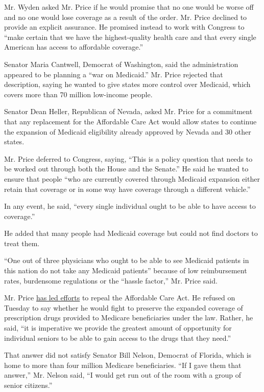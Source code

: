 Mr. Wyden asked Mr. Price if he would promise that no one would be worse
off and no one would lose coverage as a result of the order. Mr. Price
declined to provide an explicit assurance. He promised instead to work
with Congress to ``make certain that we have the highest-quality health
care and that every single American has access to affordable coverage.''

Senator Maria Cantwell, Democrat of Washington, said the administration
appeared to be planning a ``war on Medicaid.'' Mr. Price rejected that
description, saying he wanted to give states more control over Medicaid,
which covers more than 70 million low-income people.

Senator Dean Heller, Republican of Nevada, asked Mr. Price for a
commitment that any replacement for the Affordable Care Act would allow
states to continue the expansion of Medicaid eligibility already
approved by Nevada and 30 other states.

Mr. Price deferred to Congress, saying, ``This is a policy question that
needs to be worked out through both the House and the Senate.'' He said
he wanted to ensure that people ``who are currently covered through
Medicaid expansion either retain that coverage or in some way have
coverage through a different vehicle.''

In any event, he said, ``every single individual ought to be able to
have access to coverage.''

He added that many people had Medicaid coverage but could not find
doctors to treat them.

``One out of three physicians who ought to be able to see Medicaid
patients in this nation do not take any Medicaid patients'' because of
low reimbursement rates, burdensome regulations or the ``hassle
factor,'' Mr. Price said.

Mr. Price
\href{https://www.nytimes.com/2016/11/28/us/politics/tom-price-secretary-health-and-human-services.html}{has
led efforts} to repeal the Affordable Care Act. He refused on Tuesday to
say whether he would fight to preserve the expanded coverage of
prescription drugs provided to Medicare beneficiaries under the law.
Rather, he said, ``it is imperative we provide the greatest amount of
opportunity for individual seniors to be able to gain access to the
drugs that they need.''

That answer did not satisfy Senator Bill Nelson, Democrat of Florida,
which is home to more than four million Medicare beneficiaries. ``If I
gave them that answer,'' Mr. Nelson said, ``I would get run out of the
room with a group of senior citizens.''

